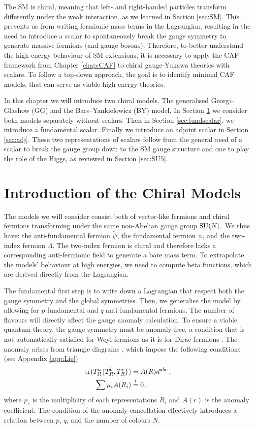 The SM is chiral, meaning that left- and right-handed particles transform differently under the weak interaction, as we learned in Section \ref{sec:SM}. This prevents us from writing fermionic mass terms in the Lagrangian, resulting in the need to introduce a scalar to spontaneously break the gauge symmetry to generate massive fermions (and gauge bosons). Therefore, to better understand the high-energy behaviour of SM extensions, it is necessary to apply the CAF framework from Chapter \ref{chap:CAF} to chiral gauge-Yukawa theories with scalars. To follow a top-down approach, the goal is to identify minimal CAF models, that can serve as viable high-energy theories.

In this chapter we will introduce two chiral models. The generalised Georgi--Glashow (GG) \cite{Georgi:1974yf} and the Bars--Yankielowicz (BY) \cite{Bars:1981se} model. In Section \ref{sec:noscalar} we consider both models separately without scalars. Then in Section \ref{sec:fundscalar}, we introduce a fundamental scalar. Finally we introduce an adjoint scalar in Section \ref{sec:adj}. These two representations of scalars follow from the general need of a scalar to break the gauge group down to the SM gauge structure and one to play the role of the Higgs, as reviewed in Section \ref{sec:SU5}. 


\section{Introduction of the Chiral Models} \label{sec:noscalar}
The models we will consider consist both of vector-like fermions and chiral fermions transforming under the same non-Abelian gauge group $\mathrm{SU}(N)$. We thus have: the anti-fundamental fermion $\tilde\psi$, the fundamental fermion $\psi$, and the two-index fermion $\Lambda$. The two-index fermion is chiral and therefore lacks a corresponding anti-fermionic field to generate a bare mass term. To extrapolate the models' behaviour at high energies, we need to compute beta functions, which are derived directly from the Lagrangian. 

The fundamental first step is to write down a Lagrangian that respect both the gauge symmetry and the global symmetries. Then, we generalise the model by allowing for $p$ fundamental and $q$ anti-fundamental fermions. The number of flavours will directly affect the gauge anomaly calculation. To ensure a viable quantum theory, the gauge symmetry must be anomaly-free, a condition that is not automatically satisfied for Weyl fermions as it is for Dirac fermions \cite{Peskin:1995ev}. The anomaly arises from triangle diagrams \cite{tong}, which impose the following conditions (see Appendix \ref{app:Lie})
\begin{align}
    \operatorname{tr}(T^a_R\{T^b_R,T^c_R\})&=A(R)d^{abc}\,,\\\sum \mu_i A(R_i)&\overset{!}{=}0\,,\label{eq:gaugeanomaly}
\end{align}
where $\mu_i$ is the multiplicity of each representations $R_i$ and $A(r)$ is the anomaly coefficient. The condition of the anomaly cancellation effectively introduces a relation between $p$, $q$, and the number of colours $N$.


